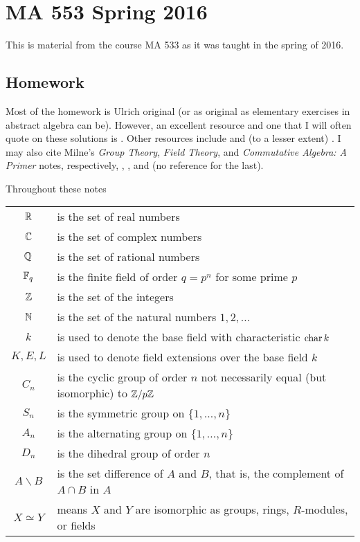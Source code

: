 \chapter{MA 553 Spring 2016}
\thispagestyle{empty}
This is material from the course MA 533 as it was taught in the spring of
2016.
\bigskip
\section{Homework}
Most of the homework is Ulrich original (or as original as elementary
exercises in abstract algebra can be). However, an excellent resource and
one that I will often quote on these solutions is \cite{hungerford}. Other
resources include \cite{dummit-foote} and (to a lesser extent)
\cite{herstein}. I may also cite Milne's \emph{Group Theory}, \emph{Field
  Theory}, and \emph{Commutative Algebra: A Primer} notes, respectively,
\cite{milneGT}, \cite{milneFT}, and (no reference for the last).


Throughout these notes

\begin{tabular}{cl}
  $\mathbb{R}$   & is the set of real numbers\\
  $\mathbb{C}$   & is the set of complex numbers\\
  $\mathbb{Q}$   & is the set of rational numbers\\
  $\mathbb{F}_q$ & is the finite field of order $q=p^n$ for some prime $p$\\
  $\mathbb{Z}$   & is the set of the integers\\
  $\mathbb{N}$   & is the set of the natural numbers $1,2,\dotsc$\\
  $k$   & is used to denote the base field with
             characteristic $\operatorname{char} k$\\
  $K,E,L$& is used to denote field extensions over the base field
                    $k$\\
  $C_n$    & is the cyclic group of order $n$ not necessarily equal
             (but isomorphic) to $\mathbb{Z}/p\mathbb{Z}$\\
  $S_n$    & is the symmetric group on $\{1,\dotsc,n\}$\\
  $A_n$    & is the alternating group on $\{1,\dotsc,n\}$\\
  $D_n$    & is the dihedral group of order $n$\\
  $A\smallsetminus B$ & is the set difference of $A$ and $B$, that is, the
                        complement of $A\cap B$ in $A$\\
  $X\simeq Y$ & means $X$ and $Y$ are isomorphic as groups, rings,
                $R$-modules, or fields
\end{tabular}

